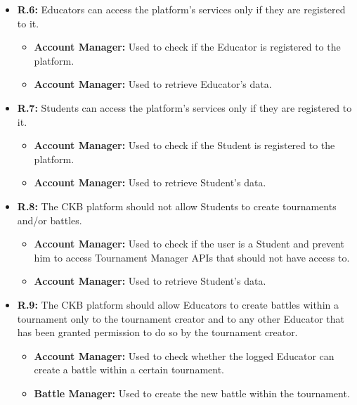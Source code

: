 \documentclass{article}
\begin{document}
{\begin{itemize}
\begin{itemize}
              registered to the platform.
              \item \textbf{Account Manager:} Used to retrieve Educator's data.
          \end{itemize}
    \item \textbf{R.6:} Educators can access the platform's services only if they are registered to it.
          \begin{itemize}
              \item \textbf{Account Manager:} Used to check if the Educator is registered to
              the platform.
              \item \textbf{Account Manager:} Used to retrieve Educator's data.
          \end{itemize}
    \item \textbf{R.7:} Students can access the platform's services only if they are registered to it.
          \begin{itemize}
            \item \textbf{Account Manager:} Used to check if the Student is registered to
            the platform.
            \item \textbf{Account Manager:} Used to retrieve Student's data.
          \end{itemize}
    \item \textbf{R.8:} The CKB platform should not allow Students to create tournaments and/or battles.
          \begin{itemize}
              \item \textbf{Account Manager:} Used to check if the user is a Student and prevent him
              to access Tournament Manager APIs that should not have access to.
              \item \textbf{Account Manager:} Used to retrieve Student's data.
          \end{itemize}
    \item \textbf{R.9:} The CKB platform should allow Educators to create battles within a tournament only to the tournament
          creator and to any other Educator that has been granted permission to do so by the tournament creator.
          \begin{itemize}
              \item \textbf{Account Manager:} Used to check whether the logged Educator can create
              a battle within a certain tournament.
              \item \textbf{Battle Manager:} Used to create the new battle within the tournament.

\end{itemize}
\end{itemize}}
\end{document}
